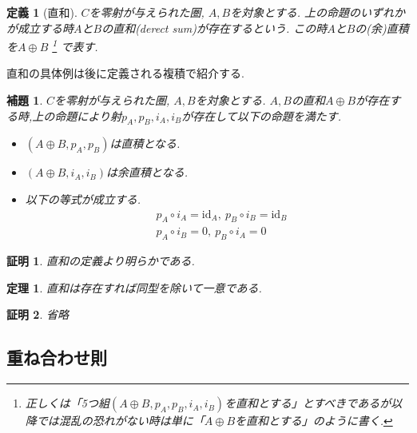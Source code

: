 \documentclass[a4paper,12pt]{ltjsarticle}
\theoremstyle{break}
\newtheorem{defn}[thm]{定義}
\newtheorem{thrm}[thm]{定理}
\newtheorem{lem}[thm]{補題}
\newtheorem*{prf}{証明}
\newcommand{\id}{\mathrm{id}}
\newcommand{\ci}{\circ}
\newcommand{\opl}{\oplus}
\numberwithin{equation}{section}
\begin{document}
\begin{defn}[直和]
  $C$を零射が与えられた圏, $A,B$を対象とする. 
  上の命題のいずれかが成立する時$A$と$B$の直和(derect sum)が存在するという. 
  この時$A$と$B$の(余)直積を$A \opl B$
  \footnote{
    正しくは「5つ組$(A \opl B,p_A,p_B,i_A,i_B)$を直和とする」とすべきであるが以降では混乱の恐れがない時は単に「$A \opl B$を直和とする」のように書く. 
  }
  で表す. 
\end{defn}

直和の具体例は後に定義される複積で紹介する. 

\begin{lem}
  $C$を零射が与えられた圏, $A,B$を対象とする. 
  $A,B$の直和$A \opl B$が存在する時,上の命題により射$p_A,p_B,i_A,i_B$が存在して以下の命題を満たす. 
  \begin{itemize}
    \item $(A \opl B,p_A,p_B)$は直積となる. 
    \item $(A \opl B,i_A,i_B)$は余直積となる. 
    \item 以下の等式が成立する. 
    \begin{align*}
      &p_A \ci i_A = \id_A, ~ p_B \ci i_B = \id_B \\
      &p_A \ci i_B = 0, ~ p_B \ci i_A = 0
    \end{align*}
  \end{itemize}
\end{lem}

\begin{prf}
  直和の定義より明らかである. 
\end{prf}

\begin{thrm}
  直和は存在すれば同型を除いて一意である. 
\end{thrm}

\begin{prf}
  省略
\end{prf}

\subsection{重ね合わせ則}
\end{document}
